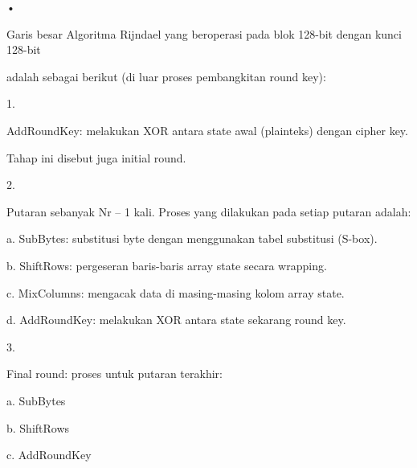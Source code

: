 \documentclass{article}
\begin{document}

• 

Garis besar Algoritma Rijndael yang beroperasi pada blok  128-bit dengan kunci 128-bit 

adalah sebagai berikut (di luar proses pembangkitan round key): 

1. 

AddRoundKey: melakukan XOR antara state awal (plainteks) dengan cipher key. 

Tahap ini disebut juga initial round. 

2. 

Putaran sebanyak Nr – 1 kali. Proses yang dilakukan pada setiap putaran adalah: 

a. SubBytes: substitusi byte dengan menggunakan tabel substitusi (S-box). 

b. ShiftRows: pergeseran baris-baris array state secara wrapping. 

c. MixColumns: mengacak data di masing-masing kolom array state. 

d. AddRoundKey: melakukan XOR antara state sekarang round key. 

3. 

Final round: proses untuk putaran terakhir: 

a. SubBytes 

b. ShiftRows 

c. AddRoundKey
\end{document}
